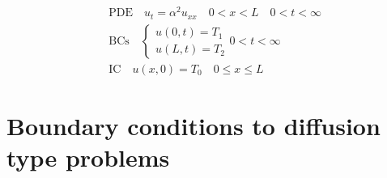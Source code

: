 \documentclass[../pde.tex]{subfiles}
\begin{document}
    \begin{align*}
        &\text{PDE} \quad u_{t} = \alpha^2 u_{xx} \quad 0<x<L \quad 0<t<\infty \\[1em]
        &\text{BCs} \quad 
        \begin{cases}
            u(0,t) = T_1\\
            u(L,t) = T_2
        \end{cases} 
        0< t<\infty \\[1em]
        &\text{IC} \quad u(x,0) = T_0 \quad 0\le x \le L
    \end{align*}


    \section{\sffamily Boundary conditions to diffusion type problems}
    
    
   
    
\end{document}

